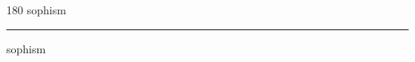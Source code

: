 
\begin{frame}
\begin{center}
\begin{turn}{180}
{\fontsize{2.5cm}{1em}\selectfont sophism}
\end{turn}
\vspace{1em}\par  
\hrule
\vspace{1em}\par  
{\fontsize{2.5cm}{1em}\selectfont sophism}
\end{center}
\end{frame}
